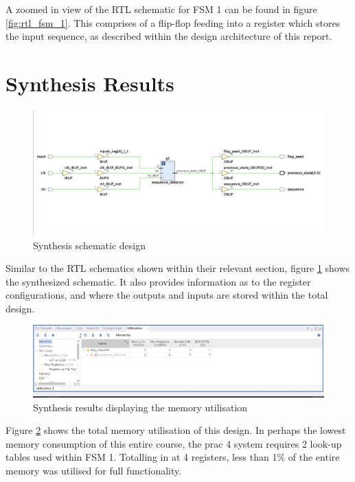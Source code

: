 \documentclass[12pt,a4paper]{article}
\begin{document}
A zoomed in view of the RTL schematic for FSM 1 can be found in figure \ref{fig:rtl_fsm_1}. This comprises of a flip-flop feeding into a register which stores the input sequence, as described within the design architecture of this report.

\section{Synthesis Results}

\begin{figure}[H]
    \centering
    \includegraphics[scale=0.25]{images/synthesis_schematic.png}
    \caption{Synthesis schematic design}
    \label{fig:synthesis_schematic}
\end{figure}

Similar to the RTL schematics shown within their relevant section, figure \ref{fig:synthesis_schematic} shows the synthesized schematic. It also provides information as to the register configurations, and where the outputs and inputs are stored within the total design.

\begin{figure}[H]
    \centering
    \includegraphics[scale=0.25]{images/synthesis_utilisation.png}
    \caption{Synthesis results displaying the memory utilisation}
    \label{fig:synthesis_utilisation}
\end{figure}

Figure \ref{fig:synthesis_utilisation} shows the total memory utilisation of this design. In perhaps the lowest memory consumption of this entire course, the prac 4 system requires 2 look-up tables used within FSM 1. Totalling in at 4 registers, less than 1$\%$ of the entire memory was utilised for full functionality.
\end{document}
